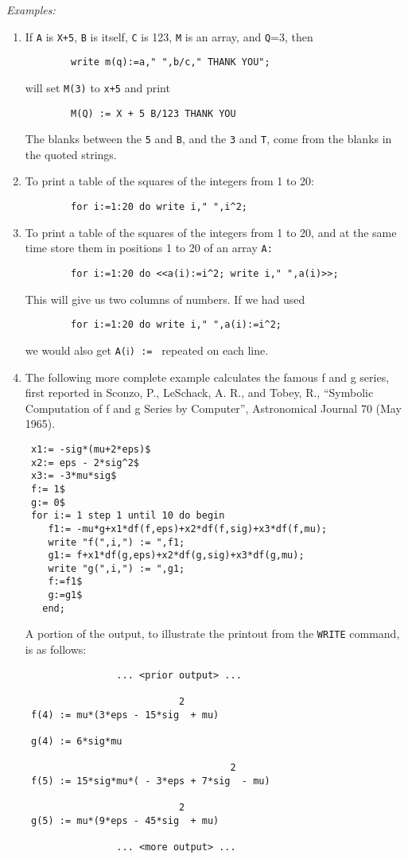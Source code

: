 \textit{Examples:}
\begin{enumerate}
\item If \texttt{A} is \texttt{X+5}, \texttt{B} is itself, \texttt{C} is 123, \texttt{M} is
an array, and \texttt{Q}=3, then
\begin{verbatim}
        write m(q):=a," ",b/c," THANK YOU";
\end{verbatim}
will set \texttt{M(3)} to \texttt{x+5} and print
\begin{verbatim}
        M(Q) := X + 5 B/123 THANK YOU
\end{verbatim}
The blanks between the \texttt{5} and \texttt{B}, and the
\texttt{3} and \texttt{T}, come from the blanks in the quoted strings.

\item To print a table of the squares of the integers from 1 to 20:
\begin{verbatim}
        for i:=1:20 do write i," ",i^2;
\end{verbatim}

\item To print a table of the squares of the integers from 1 to 20, and at
the same time store them in positions 1 to 20 of an array \texttt{A:}
\begin{verbatim}
        for i:=1:20 do <<a(i):=i^2; write i," ",a(i)>>;
\end{verbatim}
This will give us two columns of numbers. If we had used
\begin{verbatim}
        for i:=1:20 do write i," ",a(i):=i^2;
\end{verbatim}
we would also get \texttt{A(}i\texttt{) := } repeated on each line.

\item The following more complete example calculates the famous f and g
series, first reported in Sconzo, P., LeSchack, A. R., and Tobey, R.,
``Symbolic Computation of f and g Series by Computer'', Astronomical Journal
70 (May 1965).
\begin{verbatim}
 x1:= -sig*(mu+2*eps)$
 x2:= eps - 2*sig^2$
 x3:= -3*mu*sig$
 f:= 1$
 g:= 0$
 for i:= 1 step 1 until 10 do begin
    f1:= -mu*g+x1*df(f,eps)+x2*df(f,sig)+x3*df(f,mu);
    write "f(",i,") := ",f1;
    g1:= f+x1*df(g,eps)+x2*df(g,sig)+x3*df(g,mu);
    write "g(",i,") := ",g1;
    f:=f1$
    g:=g1$
   end;
\end{verbatim}
 A portion of the output, to illustrate the printout from the \texttt{WRITE}
command, is as follows:
\begin{verbatim}
                ... <prior output> ...

                           2
 f(4) := mu*(3*eps - 15*sig  + mu)

 g(4) := 6*sig*mu

                                    2
 f(5) := 15*sig*mu*( - 3*eps + 7*sig  - mu)

                           2
 g(5) := mu*(9*eps - 45*sig  + mu)

                ... <more output> ...

\end{verbatim}
\end{enumerate}

